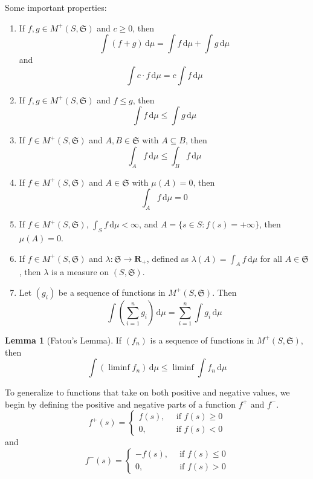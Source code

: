 \documentclass[12pt,a4paper]{article}
\theoremstyle{definition}
\newtheorem{lemma}[theorem]{Lemma}
\begin{document}
Some important properties:

\begin{enumerate}
	\item If $f, g \in M^+(S, \mathfrak{S})$ and $c \geq 0$, then 
	\[
		\int (f+g)\, \mathrm{d}\mu = \int f\, \mathrm{d}\mu + \int g\, \mathrm{d}\mu
	\]
	and
	\[
		\int c\cdot f \, \mathrm{d}\mu = c \int f\, \mathrm{d}\mu
	\]
	\item If $f, g \in M^+(S, \mathfrak{S})$ and $f \leq g$, then
	\[
		\int f\, \mathrm{d}\mu \leq \int g\, \mathrm{d}\mu
	\]
	\item If $f \in M^+(S, \mathfrak{S})$ and $A, B \in \mathfrak{S}$ with $A \subseteq B$, then
	\[
		\int_A f\, \mathrm{d}\mu \leq \int_B f\, \mathrm{d}\mu
	\]
	\item If $f \in M^+(S, \mathfrak{S})$ and $A \in \mathfrak{S}$ with $\mu(A) = 0$, then
	\[
		\int_A f\, \mathrm{d}\mu = 0
	\]
	\item If $f \in M^+(S, \mathfrak{S})$, $\int_S f\, \mathrm{d}\mu < \infty$, and $A = \{ s \in S : f(s) = +\infty \}$, then $\mu(A) = 0$.
	\item If $f \in M^+(S, \mathfrak{S})$ and $\lambda : \mathfrak{S} \longrightarrow \textbf{R}_+$, defined as $\lambda(A) = \int_A f\, \mathrm{d}\mu$ for all $A \in \mathfrak{S}$, then $\lambda$ is a measure on $(S, \mathfrak{S})$.
	\item Let $(g_i)$ be a sequence of functions in $M^+(S, \mathfrak{S})$. Then 
	\[
		\int \left( \sum_{i=1}^n g_i \right)\, \mathrm{d}\mu = \sum_{i=1}^n \int g_i\, \mathrm{d}\mu
	\]
\end{enumerate}

\begin{lemma}[Fatou's Lemma]
	If $(f_n)$ is a sequence of functions in $M^+(S, \mathfrak{S})$, then
	\[
		\int (\liminf f_n)\, \mathrm{d}\mu \leq \liminf \int f_n\, \mathrm{d}\mu
	\]
\end{lemma}

To generalize to functions that take on both positive and negative values, we begin by defining the positive and negative parts of a function $f^+$ and $f^-$.
\begin{equation*}
	f^+(s) = 
    \begin{cases}
      f(s), \, &\text{ if } f(s) \geq 0 \\
	  0, \, &\text{ if } f(s) < 0
    \end{cases}
\end{equation*}
and
\begin{equation*}
	f^-(s) = 
    \begin{cases}
      -f(s), \, &\text{ if } f(s) \leq 0 \\
	  0, \, &\text{ if } f(s) > 0
    \end{cases}
\end{equation*}
\end{document}
